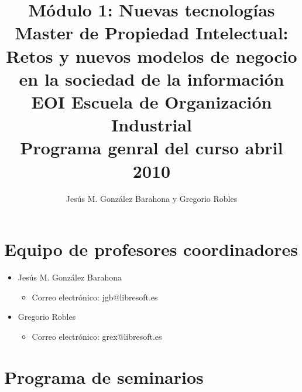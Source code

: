 \documentclass[a4paper,12pt]{article}
\title{Módulo 1: Nuevas tecnologías \\
Master de Propiedad Intelectual: \\
Retos y nuevos modelos de negocio en la sociedad de la información \\
EOI Escuela de Organización Industrial \\
Programa genral del curso abril 2010}
\author{Jesús M. González Barahona y Gregorio Robles}
\begin{document}
\maketitle

\newpage

\tableofcontents

\newpage

\section{Equipo de profesores coordinadores}

\begin{itemize}
\item Jesús M. González Barahona
  \begin{itemize}
  \item Correo electrónico: jgb@libresoft.es
  \end{itemize}
\item Gregorio Robles
  \begin{itemize}
  \item Correo electrónico: grex@libresoft.es
  \end{itemize}
\end{itemize}





\section{Programa de seminarios}
\end{document}
